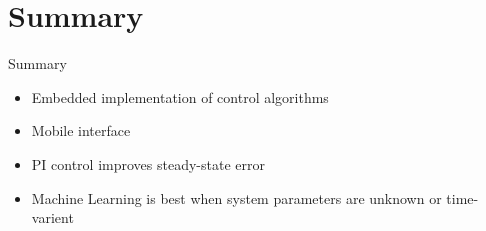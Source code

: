\documentclass{beamer}
\begin{document}
\section*{Summary}
\begin{frame}{Summary} %
  \begin{itemize}
    \item Embedded implementation of control algorithms
    \item Mobile interface
    \item PI control improves steady-state error
    \item Machine Learning is best when system parameters are unknown or time-varient
  \end{itemize}
  
\end{frame}
  
\end{document}
